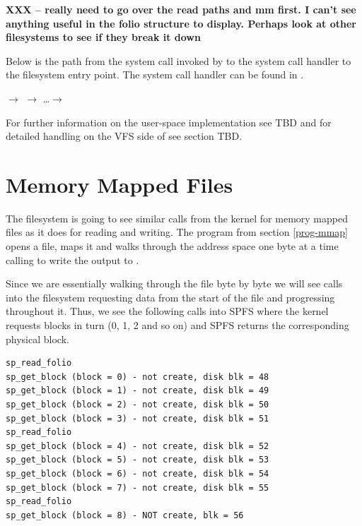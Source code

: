 \noindent
\textbf{XXX -- really need to go over the read paths and mm first. I can't see anything useful in the folio structure to display. Perhaps look at other filesystems to see if they break it down}

Below is the path from the  system call invoked by  to the system call handler to the filesystem entry point. The  system call handler can be found in . 

\small
\bigskip
{} $\rightarrow$   $\rightarrow$ \ldots $\rightarrow$ 

\bigskip
\normalsize
\noindent
For further information on the user-space implementation see TBD and for detailed handling on the VFS side of  see section TBD.



\section{Memory Mapped Files}

The filesystem is going to see similar calls from the kernel for memory mapped files as it does for reading and writing. The program from section \ref{prog-mmap} opens a file, maps it and walks through the address space one byte at a time calling  to write the output to .

Since we are essentially walking through the file byte by byte we will see calls into the filesystem requesting data from the start of the file and progressing throughout it. Thus, we see the following calls into SPFS where the kernel requests blocks in turn (0, 1, 2 and so on) and SPFS returns the corresponding physical block.

\begin{lstlisting}
sp_read_folio
sp_get_block (block = 0) - not create, disk blk = 48
sp_get_block (block = 1) - not create, disk blk = 49
sp_get_block (block = 2) - not create, disk blk = 50
sp_get_block (block = 3) - not create, disk blk = 51
sp_read_folio
sp_get_block (block = 4) - not create, disk blk = 52
sp_get_block (block = 5) - not create, disk blk = 53
sp_get_block (block = 6) - not create, disk blk = 54
sp_get_block (block = 7) - not create, disk blk = 55
sp_read_folio
sp_get_block (block = 8) - NOT create, blk = 56
\end{lstlisting}

